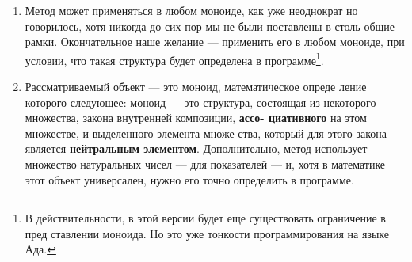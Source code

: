 \documentclass{mai_book}
\begin{document}
\begin{enumerate}


\item Метод может применяться в любом моноиде, как уже неоднократ­
но говорилось, хотя никогда до сих пор мы не были поставлены в
столь общие рамки. Окончательное наше желание — применить
его в любом моноиде, при условии, что такая структура будет
определена в программе\footnote{В действительности, в этой версии будет еще существовать ограничение в пред­
ставлении моноида. Но это уже тонкости программирования на языке Ада.}.
\item Рассматриваемый объект — это моноид, математическое опреде­
ление которого следующее: моноид — это структура, состоящая
из некоторого множества, закона внутренней композиции, {\bf ассо-
циативного} на этом множестве, и выделенного элемента множе­
ства, который для этого закона является {\bf нейтральным элементом}. Дополнительно, метод использует множество натуральных
чисел — для показателей — и, хотя в математике этот объект
универсален, нужно его точно определить в программе.

\newpage


\end{enumerate}
\end{document}
